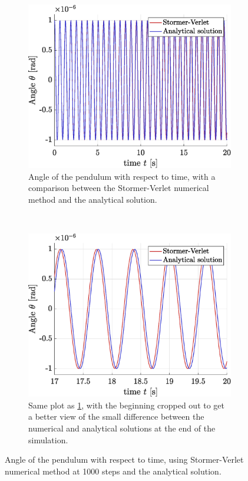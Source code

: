 \documentclass[a4paper,12pt,twoside]{article}
\begin{document}
\begin{figure}[h]
\begin{subfigure}[t]{0.49\textwidth}
	\includegraphics[width=\textwidth]{graphs/a_traj_full.eps}
	\caption{Angle of the pendulum with respect to time, with a comparison between the Stormer-Verlet numerical method and the analytical solution.}
	\label{fig:a-traj-full}
\end{subfigure}
~
\begin{subfigure}[t]{0.49\textwidth}
	\includegraphics[width=\textwidth]{graphs/a_traj_zoomed.eps}
	\caption{Same plot as \ref{fig:a-traj-full}, with the beginning cropped out to get a better view of the small difference between the numerical and analytical solutions at the end of the simulation.}
	\label{fig:a-traj-zoomed}
\end{subfigure}
\caption{Angle of the pendulum with respect to time, using Stormer-Verlet numerical method at \num{1000} steps and the analytical solution.}
\label{fig:a-traj}
\end{figure}
\end{document}
